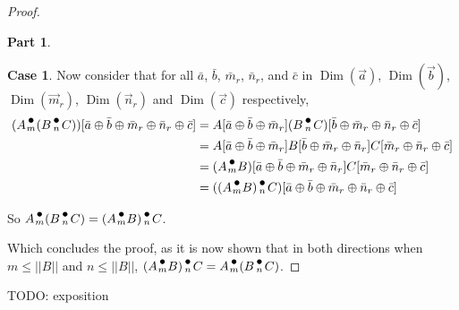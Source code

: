 \documentclass[12pt]{book}
\theoremstyle{plain}
\theoremstyle{definition}
\theoremstyle{ppart}
\newtheorem{ppart}{Part}
\theoremstyle{case}
\newtheorem{case}{Case}
\theoremstyle{solution}
\DeclareMathOperator{\Dim}{Dim}
\newcommand{\dmult}[1]{\text{\raisebox{1ex}{$\underset{#1}{\,\bullet\,}$}}}
\newcommand{\shape}[1]{\left|#1\right|}
\begin{document}
\begin{proof}
\begin{ppart}
\begin{case}
Now consider that for all $\bar{a}$, $\bar{b}$, $\bar{m}_r$, $\bar{n}_r$, and $\bar{c}$ in
$\Dim(\vec{a})$, $\Dim(\vec{b})$, $\Dim(\vec{m}_r)$, $\Dim(\vec{n}_r)$ and $\Dim(\vec{c})$ respectively,
\begin{align*}
  (A \dmult{m} (B \dmult{n} C))[\bar{a} \oplus \bar{b} \oplus \bar{m}_r \oplus \bar{n}_r \oplus \bar{c}]
  &= A[\bar{a} \oplus \bar{b} \oplus \bar{m}_r] (B \dmult{n} C)[\bar{b} \oplus \bar{m}_r \oplus \bar{n}_r \oplus \bar{c}] \\
  &= A[\bar{a} \oplus \bar{b} \oplus \bar{m}_r] B[\bar{b} \oplus \bar{m}_r \oplus \bar{n}_r] C[\bar{m}_r \oplus \bar{n}_r \oplus \bar{c}] \\
  &= (A \dmult{m} B)[\bar{a} \oplus \bar{b} \oplus \bar{m}_r \oplus \bar{n}_r] C[\bar{m}_r \oplus \bar{n}_r \oplus \bar{c}] \\
  &= ((A \dmult{m} B) \dmult{n} C)[\bar{a} \oplus \bar{b} \oplus \bar{m}_r \oplus \bar{n}_r \oplus \bar{c}]
\end{align*}

So $A \dmult{m} (B \dmult{n} C) = (A \dmult{m} B) \dmult{n} C$.
\end{case}
\end{ppart}
Which concludes the proof, as it is now shown that in both directions when $m \le \shape{\shape{B}}$ and $n \le \shape{\shape{B}}$,
$(A \dmult{m} B) \dmult{n} C = A \dmult{m} (B \dmult{n} C)$.
\end{proof}

TODO: exposition
\end{document}
